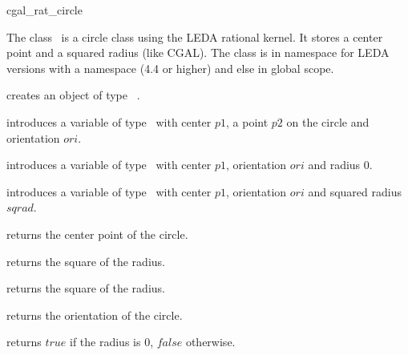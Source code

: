 \ccDefGlobalScope{}
\begin{ccRefClass}{cgal_rat_circle}

\ccDefinition


The class \ccRefName\  is a circle class using the LEDA rational kernel. It stores a center point
and a squared radius (like CGAL). The class is in namespace  for LEDA versions with a namespace
(4.4 or higher) and else in global scope.



\ccCreation

{creates an object of type \ccRefName\ .}

{introduces a variable of type \ccRefName\ with center $p1$, a point
$p2$ on the circle and orientation $ori$. }	

  
{introduces a variable of type \ccRefName\ with center $p1$, orientation $ori$
and radius $0$.}	
  
{introduces a variable of type \ccRefName\ with center $p1$, orientation $ori$
and squared radius $sqrad$.}


\ccOperations

  
{returns the center point of the circle.}   
  
{returns the square of the radius.} 

{returns the square of the radius.} 
  
{returns the orientation of the circle.}   
  
{returns $true$ if the radius is 0, $false$ otherwise.} 

\end{ccRefClass} 
